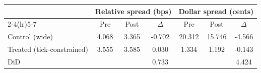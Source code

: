 \begin{tabular}{lcccccc}
\toprule
 & \multicolumn{3}{c}{Relative spread (bps)} & \multicolumn{3}{c}{Dollar spread (cents)} \\
\cmidrule(lr){2-4}\cmidrule(lr){5-7}
 & Pre & Post & $\Delta$ & Pre & Post & $\Delta$ \\
\midrule
Control (wide) & 4.068 & 3.365 & -0.702 & 20.312 & 15.746 & -4.566 \\
Treated (tick-constrained) & 3.555 & 3.585 & 0.030 & 1.334 & 1.192 & -0.143 \\
DiD &  &  & 0.733 &  &  & 4.424 \\
\bottomrule
\end{tabular}